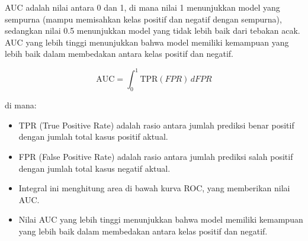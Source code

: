 AUC adalah nilai antara 0 dan 1, di mana nilai 1 menunjukkan model yang sempurna (mampu memisahkan kelas positif dan negatif dengan sempurna), sedangkan nilai 0.5 menunjukkan model yang tidak lebih baik dari tebakan acak. AUC yang lebih tinggi menunjukkan bahwa model memiliki kemampuan yang lebih baik dalam membedakan antara kelas positif dan negatif.

\begin{equation}
    \text{AUC} = \int_0^1 \text{TPR}(FPR) \, dFPR
\end{equation}

di mana:
\begin{itemize}
    \item TPR (True Positive Rate) adalah rasio antara jumlah prediksi benar positif dengan jumlah total kasus positif aktual.
    \item FPR (False Positive Rate) adalah rasio antara jumlah prediksi salah positif dengan jumlah total kasus negatif aktual.
    \item Integral ini menghitung area di bawah kurva ROC, yang memberikan nilai AUC.
    \item Nilai AUC yang lebih tinggi menunjukkan bahwa model memiliki kemampuan yang lebih baik dalam membedakan antara kelas positif dan negatif.
\end{itemize}